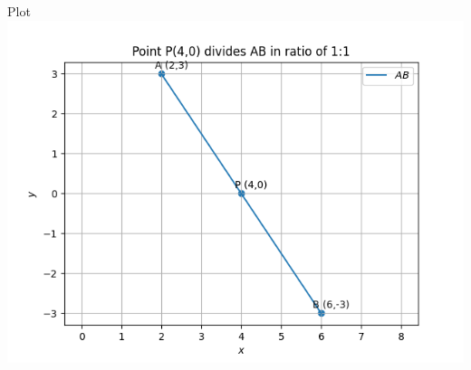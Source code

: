 \documentclass{beamer}
\begin{document}
\begin{frame}{Plot}
    \centering
    \includegraphics[width=\columnwidth, height=0.8\textheight, keepaspectratio]{figs/fig.png}     
\end{frame}
\end{document}
